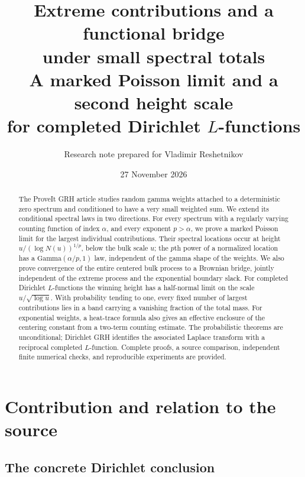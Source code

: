 \documentclass[11pt]{article}
\title{\vspace{-1.5em}\textbf{Extreme contributions and a functional bridge\\under small spectral totals}\\[0.6em]
\large A marked Poisson limit and a second height scale\\for completed Dirichlet $L$-functions}
\author{Research note prepared for Vladimir Reshetnikov}
\date{27 November 2026}
\theoremstyle{definition}
\theoremstyle{remark}
\begin{document}
\maketitle
\begin{abstract}
The ProveIt GRH article studies random gamma weights attached to a deterministic
zero spectrum and conditioned to have a very small weighted sum. We extend its
conditional spectral laws in two directions. For every spectrum with a regularly
varying counting function of index $\alpha$, and every exponent $p>\alpha$, we
prove a marked Poisson limit for the largest individual contributions. Their
spectral locations occur at height $u/(\log N(u))^{1/p}$, below the bulk scale $u$;
the $p$th power of a normalized location has a $\mathrm{Gamma}(\alpha/p,1)$ law,
independent of the gamma shape of the weights. We also prove convergence of the
entire centered bulk process to a Brownian bridge, jointly independent of the
extreme process and the exponential boundary slack. For completed Dirichlet
$L$-functions the winning height has a half-normal limit on the scale
$u/\sqrt{\log u}$. With probability tending to one, every fixed number of largest
contributions lies in a band carrying a vanishing fraction of the total mass.
For exponential weights, a heat-trace formula also gives an effective
enclosure of the centering constant from a two-term counting estimate.
The probabilistic theorems are unconditional; Dirichlet GRH identifies the
associated Laplace transform with a reciprocal completed $L$-function.
Complete proofs, a source comparison, independent finite numerical checks,
and reproducible experiments are provided.
\end{abstract}

\section{Contribution and relation to the source}

\subsection{The concrete Dirichlet conclusion}
\end{document}
